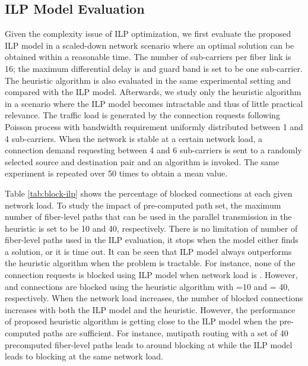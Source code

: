 \documentclass[conference]{IEEEtran}
\begin{document}
\subsection{ILP Model Evaluation} \label{small}
 \par Given the complexity issue of ILP optimization, we first evaluate the proposed ILP model in a scaled-down network scenario where an optimal solution can be obtained within a reasonable time. The number of sub-carriers per fiber link is 16; the maximum differential delay  is   and guard band is set to be one sub-carrier.
The heuristic algorithm is also evaluated in the  same experimental setting and compared with the ILP model.  
Afterwards,  we study only the heuristic algorithm in a scenario where the ILP model becomes intractable and thus of little practical relevance.     The traffic load is generated by the connection requests following Poisson process with bandwidth requirement uniformly distributed between 1   and 4 sub-carriers. When the  network is stable at a certain network load, a  connection demand requesting between 4 and 6  sub-carriers is sent to a randomly selected source and destination pair and an algorithm is invoked. The same experiment is repeated over 50 times to obtain a mean value.
  
\par    Table \ref{tab:block-ilp} shows the percentage of blocked connections  at each given network load. To study the impact of pre-computed path set,   the maximum number of fiber-level paths that can be used in the parallel transmission in the heuristic is set to be 10 and 40, respectively. There is no limitation of number of fiber-level paths used in the ILP evaluation, it stops when the model either finds a solution, or it is time out.   It can be seen that ILP model always outperforms the heuristic algorithm when the problem is tractable. For instance, none of  the connection requests is blocked using ILP model  when network load is . However,     and   connections are blocked using the heuristic algorithm with  =10 and   = 40, respectively. When the network load increases,  the number of blocked connections increases with both the ILP model and the  
    heuristic.  However,   the performance of proposed heuristic algorithm is getting close to the ILP model when the 
    pre-computed paths are sufficient. For instance, mutipath routing with a set of 40 precomputed fiber-level paths leads to      around  blocking at  while the ILP model leads to  blocking at the same     network load. 
    
\end{document}
